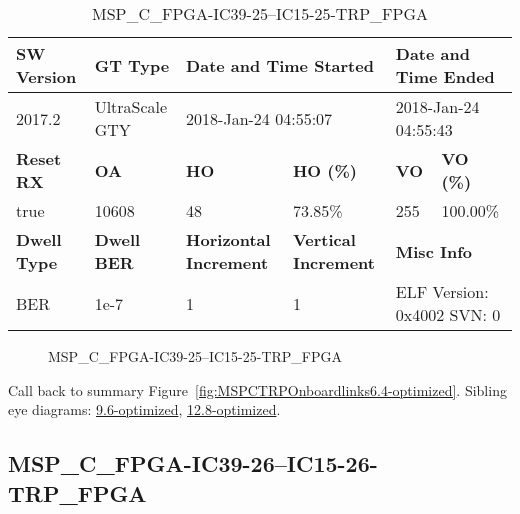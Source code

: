 \begin{table}[h]
\centering
\caption{MSP\_C\_FPGA-IC39-25--IC15-25-TRP\_FPGA}
\label{tab:MSPCFPGAIC3925IC1525TRPFPGA6.4-optimized}
\begin{tabular}{@{}|l|l|l|l|l|l|@{}}
\toprule
\textbf{SW Version}                & \textbf{GT Type}   & \multicolumn{2}{l|}{\textbf{Date and Time Started}}            & \multicolumn{2}{l|}{\textbf{Date and Time Ended}}        \\ \midrule
2017.2                       & UltraScale GTY          & \multicolumn{2}{l|}{2018-Jan-24 04:55:07}                   & \multicolumn{2}{l|}{2018-Jan-24 04:55:43}               \\ \midrule
\textbf{Reset RX}                  & \textbf{OA} & \textbf{HO}   & \textbf{HO (\%)} & \textbf{VO} & \textbf{VO (\%)} \\ \midrule
true & 10608        & 48          & 73.85\%        & 255        & 100.00\%       \\ \midrule
\textbf{Dwell Type}                & \textbf{Dwell BER} & \textbf{Horizontal Increment} & \textbf{Vertical Increment}    & \multicolumn{2}{l|}{\textbf{Misc Info}}                  \\ \midrule
BER                            & 1e-7        & 1        & 1           & \multicolumn{2}{l|}{ELF Version: 0x4002 SVN: 0}                         \\ \bottomrule
\end{tabular}
\end{table}

\begin{figure}[h]
\caption{MSP\_C\_FPGA-IC39-25--IC15-25-TRP\_FPGA} \label{fig:MSPCFPGAIC3925IC1525TRPFPGA6.4-optimized}
\end{figure}

Call back to summary Figure~\ref{fig:MSPCTRPOnboardlinks6.4-optimized}.
Sibling eye diagrams: \hyperref[sec:MSPCFPGAIC3925IC1525TRPFPGA9.6-optimized]{9.6-optimized}, \hyperref[sec:MSPCFPGAIC3925IC1525TRPFPGA12.8-optimized]{12.8-optimized}.

\clearpage
\newpage


\subsection{MSP\_C\_FPGA-IC39-26--IC15-26-TRP\_FPGA}\label{sec:MSPCFPGAIC3926IC1526TRPFPGA6.4-optimized}

